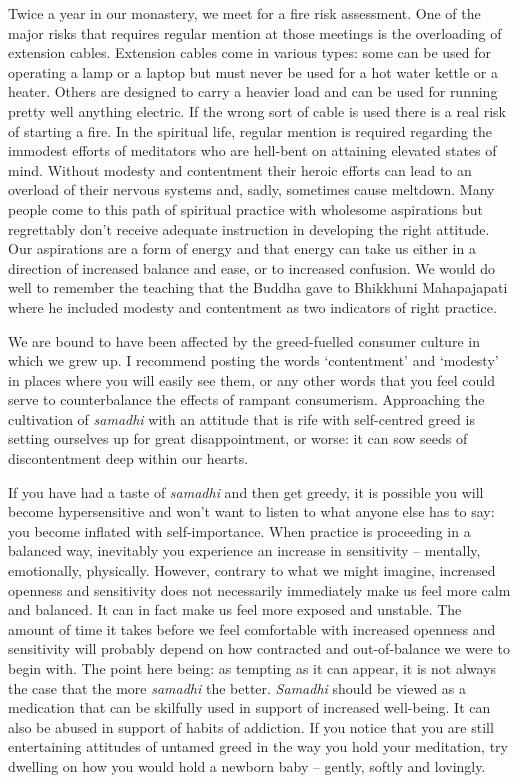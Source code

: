 Twice a year in our monastery, we meet for a fire risk assessment. One
of the major risks that requires regular mention at those meetings is
the overloading of extension cables. Extension cables come in various
types: some can be used for operating a lamp or a laptop but must never
be used for a hot water kettle or a heater. Others are designed to carry
a heavier load and can be used for running pretty well anything
electric. If the wrong sort of cable is used there is a real risk of
starting a fire. In the spiritual life, regular mention is required
regarding the immodest efforts of meditators who are hell-bent on
attaining elevated states of mind. Without modesty and contentment their
heroic efforts can lead to an overload of their nervous systems and,
sadly, sometimes cause meltdown. Many people come to this path of
spiritual practice with wholesome aspirations but regrettably don't
receive adequate instruction in developing the right attitude. Our
aspirations are a form of energy and that energy can take us either in a
direction of increased balance and ease, or to increased confusion. We
would do well to remember the teaching that the Buddha gave to Bhikkhuni
Mahapajapati where he included modesty and contentment as two indicators
of right practice.

We are bound to have been affected by the greed-fuelled consumer culture
in which we grew up. I recommend posting the words `contentment' and
`modesty' in places where you will easily see them, or any other words
that you feel could serve to counterbalance the effects of rampant
consumerism. Approaching the cultivation of \emph{samadhi} with an
attitude that is rife with self-centred greed is setting ourselves up
for great disappointment, or worse: it can sow seeds of discontentment
deep within our hearts.

If you have had a taste of \emph{samadhi} and then get greedy, it is
possible you will become hypersensitive and won't want to listen to what
anyone else has to say: you become inflated with self-importance. When
practice is proceeding in a balanced way, inevitably you experience an
increase in sensitivity -- mentally, emotionally, physically. However,
contrary to what we might imagine, increased openness and sensitivity
does not necessarily immediately make us feel more calm and balanced. It
can in fact make us feel more exposed and unstable. The amount of time
it takes before we feel comfortable with increased openness and
sensitivity will probably depend on how contracted and out-of-balance we
were to begin with. The point here being: as tempting as it can appear,
it is not always the case that the more \emph{samadhi} the better.
\emph{Samadhi} should be viewed as a medication that can be skilfully
used in support of increased well-being. It can also be abused in
support of habits of addiction. If you notice that you are still
entertaining attitudes of untamed greed in the way you hold your
meditation, try dwelling on how you would hold a newborn baby -- gently,
softly and lovingly.

